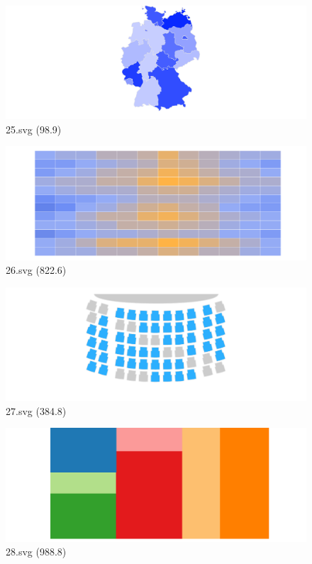 \documentclass[journal]{IEEEtran}
\begin{document}
\begin{figure}[!htbp]
\centering
\begin{minipage}{0.233\columnwidth}
\centering
\includegraphics[width=\textwidth]{Train_set/25.pdf}
{25.svg (98.9)}
\end{minipage}
\hfill
\begin{minipage}{0.233\columnwidth}
\centering
\includegraphics[width=\textwidth]{Train_set/26.pdf}
{26.svg (822.6)}
\end{minipage}
\hfill
\begin{minipage}{0.233\columnwidth}
\centering
\includegraphics[width=\textwidth]{Train_set/27.pdf}
{27.svg (384.8)}
\end{minipage}
\hfill
\begin{minipage}{0.233\columnwidth}
\centering
\includegraphics[width=\textwidth]{Train_set/28.pdf}
{28.svg (988.8)}
\end{minipage}
\end{figure}
\end{document}
